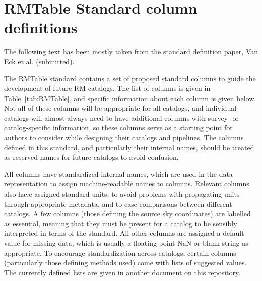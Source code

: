 \documentclass[10pt,modern]{aastex63}
\begin{document}
 
 
 
 \section{RMTable Standard column definitions}

The following text has been mostly taken from the standard definition paper, Van Eck et al. (submitted).

 
The RMTable standard contains a set of proposed standard columns to guide the development of future RM catalogs. The list of columns is given in Table~\ref{tab:RMTable}, and specific information about each column is given below. Not all of these columns will be appropriate for all catalogs, and individual catalogs will almost always need to have additional columns with survey- or catalog-specific information, so these columns serve as a starting point for authors to consider while designing their catalogs and pipelines. The columns defined in this standard, and particularly their internal names, should be treated as reserved names for future catalogs to avoid confusion.

All columns have standardized internal names, which are used in the data representation to assign machine-readable names to columns. Relevant columns also have assigned standard units, to avoid problems with propagating units through appropriate metadata, and to ease comparisons between different catalogs. A few columns (those defining the source sky coordinates) are labelled as essential, meaning that they must be present for a catalog to be sensibly interpreted in terms of the standard. All other columns are assigned a default value for missing data, which is usually a floating-point NaN or blank string as appropriate. 
To encourage standardization across catalogs, certain columns (particularly those defining methods used) come with lists of suggested values. The currently defined lists are given in another document on this repository. 
\end{document}
